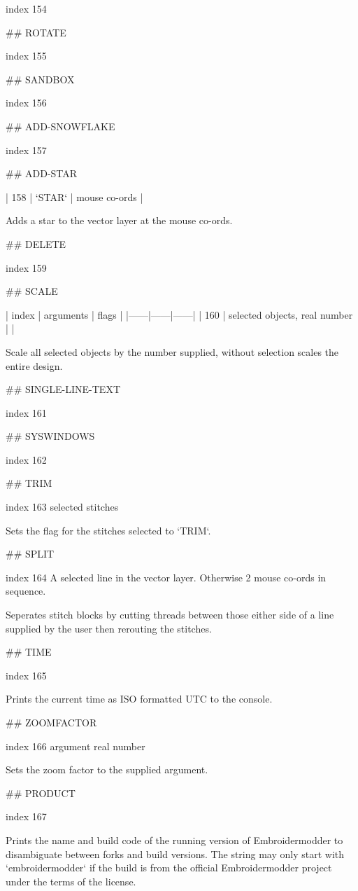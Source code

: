  index 154



## ROTATE

index 155



## SANDBOX

index 156



## ADD-SNOWFLAKE

index 157



## ADD-STAR

| 158 | `STAR` | mouse co-ords |

Adds a star to the vector layer at the mouse co-ords.

## DELETE

index 159



## SCALE

| index | arguments | flags |
|------|------|------|
| 160 | selected objects, real number | |

Scale all selected objects by the number supplied, without selection scales the
entire design.

## SINGLE-LINE-TEXT

index 161



## SYSWINDOWS

index 162


## TRIM

index 163
selected stitches 

Sets the flag for the stitches selected to `TRIM`.

## SPLIT

index 164
A selected line in the vector layer. Otherwise 2 mouse co-ords in sequence.

Seperates stitch blocks by cutting threads between those either side of a line
supplied by the user then rerouting the stitches.

## TIME

index 165

Prints the current time as ISO formatted UTC to the console.

## ZOOMFACTOR

index 166 argument real number

Sets the zoom factor to the supplied argument.

## PRODUCT

index 167

Prints the name and build code of the running version of Embroidermodder to
disambiguate between forks and build versions. The string may only start with
`embroidermodder` if the build is from the official Embroidermodder project
under the terms of the license.

